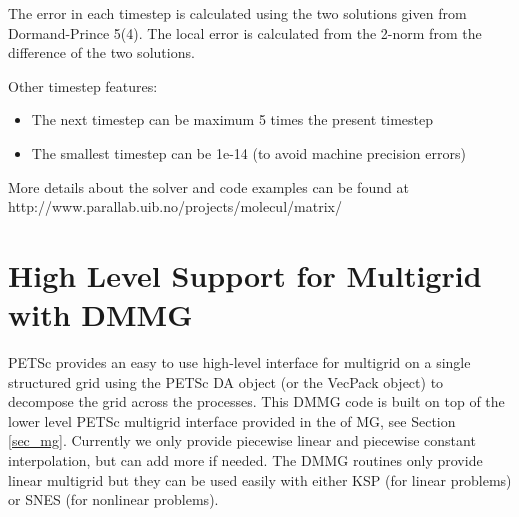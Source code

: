 The error in each timestep is calculated using the two solutions given
from Dormand-Prince 5(4). The local error is calculated from the
2-norm from the difference of the two solutions.

Other timestep features:
\begin{itemize}
  \item The next timestep can be maximum 5 times the present timestep
  \item The smallest timestep can be 1e-14 (to avoid machine precision
  errors)
\end{itemize}

More details about the solver and code examples can be found at
http://www.parallab.uib.no/projects/molecul/matrix/


\chapter{High Level Support for Multigrid with DMMG}
\label{chapter_dmmg}

PETSc provides an easy to use high-level interface for multigrid on a
single structured grid using the PETSc DA object (or the VecPack
object) to decompose the grid across the processes.  This DMMG code
 is built on top of the lower level PETSc multigrid
interface provided in the  of MG, see Section
\ref{sec_mg}. Currently we only provide piecewise linear and piecewise
constant interpolation, but can add more if needed. The DMMG routines
only provide linear multigrid but they can be used easily with either
KSP (for linear problems) or SNES (for nonlinear problems).

